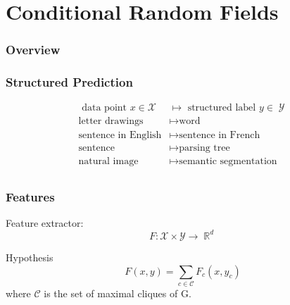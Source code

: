 \documentclass{beamer}
\DeclareMathOperator{\R}{\mathbb{R}}
\DeclareMathOperator{\1}{\mathbb{1}}
\DeclareMathOperator{\Y}{\mathcal{Y}}
\begin{document}
\section{Conditional Random Fields}
\begin{frame}
	\frametitle{Overview}
	\tableofcontents[currentsection] 
\end{frame}
\begin{frame}
\frametitle{Structured Prediction}

\begin{center}
	\begin{align*}
		\textrm{ data point } x \in \mathcal X & \mapsto \textrm{ structured label } y \in \Y \\
		\textrm{letter drawings} & \mapsto \textrm{word}  \\
		\textrm{sentence in English} & \mapsto \textrm{sentence in French}  \\
		\textrm{sentence} & \mapsto \textrm{parsing tree}  \\
		\textrm{natural image} & \mapsto \textrm{semantic segmentation}  \\
	\end{align*}


\end{center}
\end{frame}
\begin{frame}
\frametitle{Features}

Feature extractor:
\begin{equation*}
	F:\mathcal X \times \mathcal Y \rightarrow \R^d
\end{equation*}

\begin{block}{Hypothesis}
	\begin{equation*}
		F(x, y) =  \sum_{c\in \mathcal{C}} F_c(x, y_c)
	\end{equation*}
	where $\mathcal C$ is the set of maximal cliques of G.
\end{block}

\end{frame}
\end{document}
